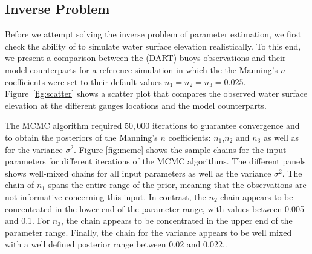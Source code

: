 \subsection{Inverse Problem} 
\label{sec:inverse}

Before we attempt solving the inverse problem of parameter estimation, 
we first check the ability of \geoclaw to simulate water surface elevation
realistically. To this end, we present a comparison between the 
(DART) buoys observations  and their \geoclaw model counterparts
for a reference simulation in which the  the Manning's $n$ coefficients were set to their default values $n_1=n_2=n_3=0.025$. Figure~\ref{fig:scatter} 
shows a scatter plot that compares the observed 
water surface elevation at the different gauges locations and the  \geoclaw model counterparts. 


The MCMC algorithm required $50,000$ iterations to guarantee convergence
and to obtain the posteriors of the Manning's $n$ coefficients: 
$n_1$,$n_2$ and $n_3$ as well as for the variance $\sigma^2$. Figure \ref{fig:mcmc} 
shows the sample chains for the input parameters for different iterations of the MCMC algorithms. 
The different panels shows well-mixed chains for all input parameters as well as the variance $\sigma^2$.
The chain of  $n_{1}$ spans the entire range of the prior, meaning that the observations are not informative 
concerning this input.  In contrast, the $n_{2}$ chain appears to be concentrated in the 
lower end of the parameter range, with values between 0.005 and 0.1. 
For $n_{3}$, the chain appears to be concentrated in the 
upper end of the parameter range. Finally, the chain for the variance 
appears to be well mixed with a well defined posterior range between 0.02 and 0.022..

